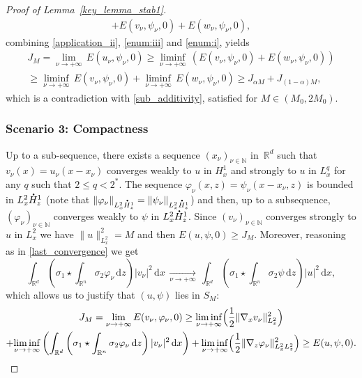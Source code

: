 \documentclass[10pt]{amsart}
\theoremstyle{definition}
\newcommand*{\overbigdot}[1]{%
\accentset{\mbox{\large\bfseries .}}{#1}}
\newenvironment{ProofOf}[1]{\begin{proof}[Proof of #1]}{\end{proof}}
\newcommand{\R}{\mathbb{R}}
\newcommand{\ud}{\, {\mathrm{d}}}
\begin{document}
\begin{ProofOf}{Lemma~\ref{key_lemma_stab1}}
\begin{multline*}
+E(v_{\nu},\psi_{\nu},0)+E(w_{\nu},\psi_{\nu},0),
\end{multline*}
\egroup
combining \eqref{application_ii}, \eqref{enum:iii} and \eqref{enum:i}, yields
\begin{multline*}
J_{M}=\underset{\nu\to +\infty}{\lim}\,E(u_{\nu},\psi_{\nu},0)\geq\underset{\nu\to+\infty}{\liminf}\,\left(E(v_{\nu},\psi_{\nu},0)+E(w_{\nu},\psi_{\nu},0)\right)\\
\geq\underset{\nu\to+\infty}{\liminf}\,E(v_{\nu},\psi_{\nu},0)+\underset{\nu\to+\infty}{\liminf}\,E(w_{\nu},\psi_{\nu},0)\geq J_{\alpha M}+J_{(1-\alpha)M},
\end{multline*}
which is a contradiction with \eqref{sub_additivity}, satisfied for $M\in (M_0,2M_0)$.

\subsubsection*{Scenario 3: Compactness} Up to a sub-sequence, there exists a sequence $(x_{\nu})_{\nu\in\mathbb N}$ in~$\R^{d}$ such that $v_{\nu}(x)=u_{\nu}(x-x_{\nu})$ converges weakly to $u$ in $H_{x}^{1}$ and strongly to $u$ in $L_{x}^{q}$ for any $q$ such that $2\leq q<2^{*}$. The sequence $\varphi_{\nu}(x,z)=\psi_{\nu}(x-x_{\nu},z)$ is bounded in $L_{x}^{2}\overbigdot{H}_{z}^{1}$ (note that $\|\varphi_{\nu}\|_{L_{x}^{2}\overbigdot{H}_{z}^{1}}=\|\psi_{\nu}\|_{L_{x}^{2}\overbigdot{H}_{z}^{1}}$) and then, up to a subsequence, $(\varphi_{\nu})_{\nu\in\mathbb N}$ converges weakly to $\psi$ in $L_{x}^{2}\overbigdot{H}_{z}^{1}$. Since $(v_{\nu})_{\nu\in\mathbb N}$ converges strongly to $u$ in $L_{x}^{2}$ we have $\|u\|_{L_{x}^{2}}^{2}=M$ and then $E(u,\psi,0)\geq J_{M}$. Moreover, reasoning as in \eqref{last_convergence} we get
\begin{equation}\label{cv1}
\int_{\R^{d}}\left(\sigma_{1}\star\int_{\R^{n}}\sigma_{2}\varphi_{\nu}\ud z\right)|v_{\nu}|^{2}\ud x\,\underset{\nu\to+\infty}{\to}\,\int_{\R^{d}}\left(\sigma_{1}\star\int_{\R^{n}}\sigma_{2}\psi\ud z\right)|u|^{2}\ud x,
\end{equation}
which allows us to justify that $(u,\psi)$ lies in $S_{M}$:
\bgroup
{}
\begin{multline*}
J_{M}=\underset{\nu\to+\infty}{\lim}\,E(v_{\nu},\varphi_{\nu},0)\geq\underset{\nu\to+\infty}{\liminf}\Bigl(\frac{1}{2}\|\nabla_{x}v_{\nu}\|_{L_{x}^{2}}^{2}\Bigr)\\
+\underset{\nu\to +\infty}{\liminf}\left(\int_{\R^{d}}\left(\sigma_{1}\star\int_{\R^{n}}\sigma_{2}\varphi_{\nu}\ud z\right)|v_{\nu}|^{2}\ud x\right)+\underset{\nu\to+\infty}{\liminf}\Bigl(\frac{1}{2}\|\nabla_{z}\varphi_{\nu}\|_{L_{x}^{2}L_{z}^{2}}^{2}\Bigr)\geq E(u,\psi,0).

\end{multline*}
\end{ProofOf}
\end{document}
